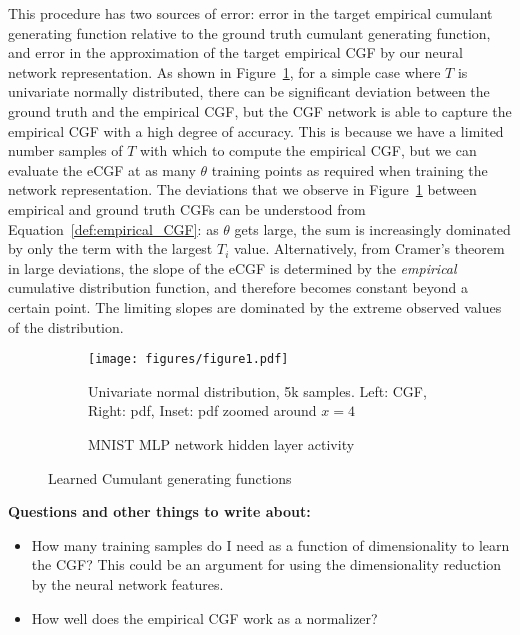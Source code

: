\documentclass[11pt]{article}      %
\begin{document}
This procedure has two sources of error: error in the target empirical cumulant generating function relative to the ground truth cumulant generating function, and error in the approximation of the target empirical CGF by our neural network representation. 
As shown in Figure~\ref{fig:1a_CGF_Normal}, for a simple case where $T$ is univariate normally distributed, there can be significant deviation between the ground truth and the empirical CGF, but the CGF network is able to capture the empirical CGF with a high degree of accuracy.
This is because we have a limited number samples of $T$ with which to compute the empirical CGF, but we can evaluate the eCGF at as many $\theta$ training points as required when training the network representation.
The deviations that we observe in Figure~\ref{fig:1a_CGF_Normal} between empirical and ground truth CGFs can be understood from Equation~\ref{def:empirical_CGF}: as $\theta$ gets large, the sum is increasingly dominated by only the term with the largest $T_i$ value.
Alternatively, from Cramer's theorem in large deviations, the slope of the eCGF is determined by the \textit{empirical} cumulative distribution function, and therefore becomes constant beyond a certain point.
The limiting slopes are dominated by the extreme observed values of the distribution.

\begin{figure}[tb]
  \centering
  \begin{subfigure}[t]{\textwidth}
    \centering
    \texttt{[image: figures/figure1.pdf]}
    \caption{Univariate normal distribution, 5k samples. Left: CGF, Right: pdf, Inset: pdf zoomed around $x=4$}
    \label{fig:1a_CGF_Normal}
  \end{subfigure}
  \begin{subfigure}[t]{\textwidth}
    \centering
    \caption{MNIST MLP network hidden layer activity}
    \label{fig:1b_CGF_MNIST}
  \end{subfigure}

  \caption{Learned Cumulant generating functions}
  \label{fig:1_CGF}
\end{figure}

\noindent \textbf{Questions and other things to write about:}
\begin{itemize}
  \item How many training samples do I need as a function of dimensionality to learn the CGF? This could be an argument for using the dimensionality reduction by the neural network features.
  \item How well does the empirical CGF work as a normalizer?
\end{itemize}
\end{document}
